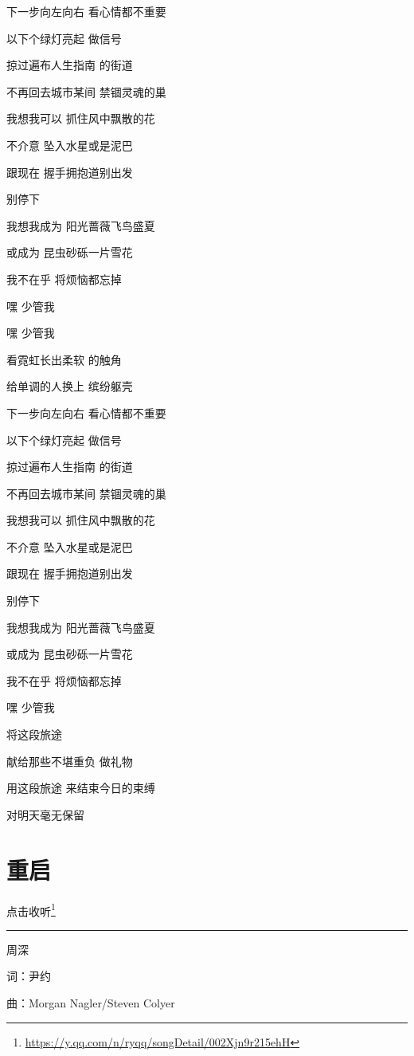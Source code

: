 \documentclass[]{ctexbook}
\renewcommand{\href}[2]{#2\footnote{\url{#1}}}
\begin{document}
下一步向左向右 看心情都不重要

以下个绿灯亮起 做信号

掠过遍布人生指南 的街道

不再回去城市某间 禁锢灵魂的巢

我想我可以 抓住风中飘散的花

不介意 坠入水星或是泥巴

跟现在 握手拥抱道别出发

别停下

我想我成为 阳光蔷薇飞鸟盛夏

或成为 昆虫砂砾一片雪花

我不在乎 将烦恼都忘掉

嘿 少管我

嘿 少管我

看霓虹长出柔软 的触角

给单调的人换上 缤纷躯壳

下一步向左向右 看心情都不重要

以下个绿灯亮起 做信号

掠过遍布人生指南 的街道

不再回去城市某间 禁锢灵魂的巢

我想我可以 抓住风中飘散的花

不介意 坠入水星或是泥巴

跟现在 握手拥抱道别出发

别停下

我想我成为 阳光蔷薇飞鸟盛夏

或成为 昆虫砂砾一片雪花

我不在乎 将烦恼都忘掉

嘿 少管我

将这段旅途

献给那些不堪重负 做礼物

用这段旅途 来结束今日的束缚

对明天毫无保留

\section*{重启}\label{restart}


\href{https://y.qq.com/n/ryqq/songDetail/002Xjn9r215ehH}{点击收听}

\begin{center}\rule{0.5\linewidth}{0.5pt}\end{center}

周深

词：尹约

曲：Morgan Nagler/Steven Colyer
\end{document}
